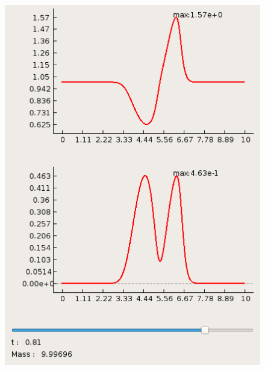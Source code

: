 \documentclass[a4paper, 11pt]{article}
\begin{document}
\begin{figure}[H]
	\begin{minipage}[h] {0.49\linewidth}
		\includegraphics[width=1\linewidth]{p2/p2_t=0,8.png}
	\end{minipage}
	\begin{minipage}[h] {0.49\linewidth}

\end{minipage}
\end{figure}
\end{document}
